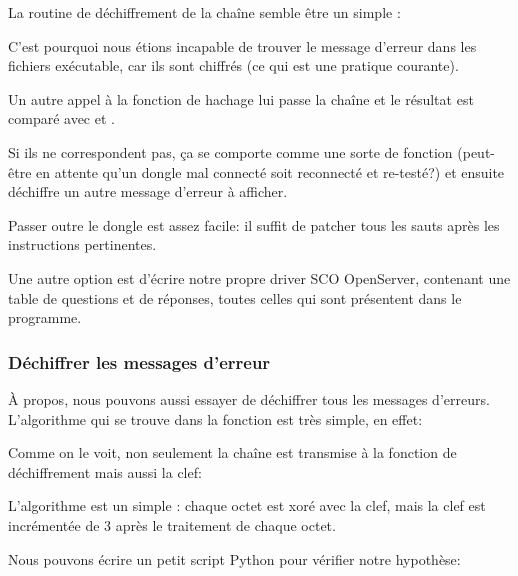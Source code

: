 
La routine de déchiffrement de la chaîne semble être un simple :



C'est pourquoi nous étions incapable de trouver le message d'erreur dans les fichiers
exécutable, car ils sont chiffrés (ce qui est une pratique courante).

Un autre appel à la fonction de hachage  lui passe la chaîne 
et le résultat est comparé avec  et .

Si ils ne correspondent pas, ça se comporte comme une sorte de fonction 
(peut-être en attente qu'un dongle mal connecté soit reconnecté et re-testé?) et ensuite
déchiffre un autre message d'erreur à afficher.



Passer outre le dongle est assez facile: il suffit de patcher tous les sauts après
les instructions \CMP pertinentes.

Une autre option est d'écrire notre propre driver SCO OpenServer, contenant une table
de questions et de réponses, toutes celles qui sont présentent dans le programme.

\subsubsection{Déchiffrer les messages d'erreur}

À propos, nous pouvons aussi essayer de déchiffrer tous les messages d'erreurs.
L'algorithme qui se trouve dans la fonction  est très simple, en effet:



Comme on le voit, non seulement la chaîne est transmise à la fonction de déchiffrement
mais aussi la clef:



L'algorithme est un simple : chaque octet est xoré avec la clef, mais
la clef est incrémentée de 3 après le traitement de chaque octet.

Nous pouvons écrire un petit script Python pour vérifier notre hypothèse:

